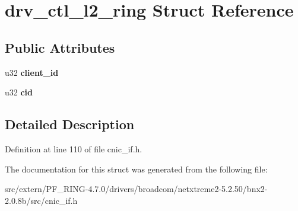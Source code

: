 \hypertarget{structdrv__ctl__l2__ring}{
\section{drv\_\-ctl\_\-l2\_\-ring Struct Reference}
\label{structdrv__ctl__l2__ring}
}
\subsection*{Public Attributes}
\begin{DoxyCompactItemize}
\item 
\hypertarget{structdrv__ctl__l2__ring_a9da80dd9953f5ccc3ff886620a691ad3}{
u32 {\bfseries client\_\-id}}
\label{structdrv__ctl__l2__ring_a9da80dd9953f5ccc3ff886620a691ad3}

\item 
\hypertarget{structdrv__ctl__l2__ring_a816ea3572ff99ab9d50dbc68e3bad3a7}{
u32 {\bfseries cid}}
\label{structdrv__ctl__l2__ring_a816ea3572ff99ab9d50dbc68e3bad3a7}

\end{DoxyCompactItemize}


\subsection{Detailed Description}


Definition at line 110 of file cnic\_\-if.h.



The documentation for this struct was generated from the following file:\begin{DoxyCompactItemize}
\item 
src/extern/PF\_\-RING-\/4.7.0/drivers/broadcom/netxtreme2-\/5.2.50/bnx2-\/2.0.8b/src/cnic\_\-if.h\end{DoxyCompactItemize}
